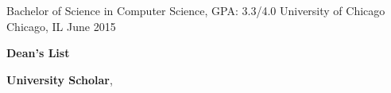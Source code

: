 
\begin{cventries}
  \cventry
    {Bachelor of Science in Computer Science, GPA: 3.3/4.0} %
    {University of Chicago} %
    {Chicago, IL} %
    {June 2015} %
    {
      \begin{cvitems} %
         \item {\textbf{Dean's List} }
         \vspace{0.5mm}
         \item {\textbf{University Scholar}, }
      \end{cvitems}
    }
\end{cventries}
